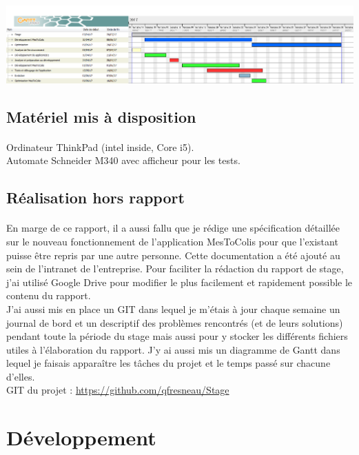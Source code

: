 \documentclass[a4paper,12pt]{extarticle}
\begin{document}
			\centerline{\includegraphics[scale=0.4]{DiagrammeDeGantt}}
	
	\subsection{Matériel mis à disposition}
		\paragraph{}
			
	Ordinateur ThinkPad (intel inside, Core i5).\\
Automate Schneider M340 avec afficheur pour les tests.\\
	
	\subsection{Réalisation hors rapport}
		\paragraph{}

	En marge de ce rapport, il a aussi fallu que je rédige une spécification détaillée sur le nouveau fonctionnement de l’application MesToColis pour que l'existant puisse être repris par une autre personne. Cette documentation a été ajouté au sein de l’intranet de l’entreprise.
Pour faciliter la rédaction du rapport de stage, j’ai utilisé Google Drive pour modifier le plus facilement et rapidement possible le contenu du rapport.\\
J’ai aussi mis en place un GIT dans lequel je m’étais à jour chaque semaine un journal de bord et un descriptif des problèmes rencontrés (et de leurs solutions) pendant toute la période du stage mais aussi pour y stocker les différents fichiers utiles à l’élaboration du rapport. J’y ai aussi mis un diagramme de Gantt dans lequel je faisais apparaître les tâches du projet et le temps passé sur chacune d'elles.\\
GIT du projet : \url{https://github.com/qfresneau/Stage}\\

	\section{Développement}
\end{document}

